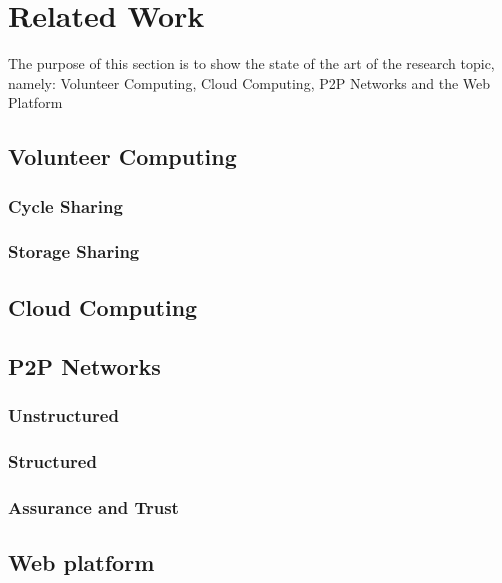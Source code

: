 % 
% 

\section{Related Work}
The purpose of this section is to show the state of the art of the research topic, namely: Volunteer Computing, Cloud Computing, P2P Networks and the Web Platform


\subsection{Volunteer Computing}



\subsubsection{Cycle Sharing}

\subsubsection{Storage Sharing}


\subsection{Cloud Computing}


\subsection{P2P Networks}
\subsubsection{Unstructured}

\subsubsection{Structured}

\subsubsection{Assurance and Trust}


\subsection{Web platform} 


